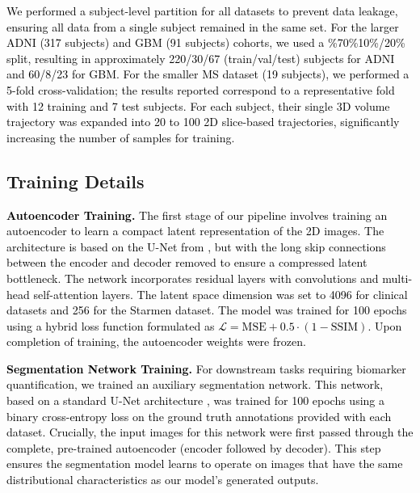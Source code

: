 \documentclass[twoside]{article}
\newcommand{\bc}[1]{\textcolor{black}{#1}}
\begin{document}
\bc{We performed a subject-level partition for all datasets to prevent data leakage, ensuring all data from a single subject remained in the same set. For the larger ADNI (317 subjects) and GBM (91 subjects) cohorts, we used a \%70\%10\%/20\% split, resulting in approximately 220/30/67 (train/val/test) subjects for ADNI and 60/8/23 for GBM. For the smaller MS dataset (19 subjects), we performed a 5-fold cross-validation; the results reported correspond to a representative fold with 12 training and 7 test subjects. For each subject, their single 3D volume trajectory was expanded into 20 to 100 2D slice-based trajectories, significantly increasing the number of samples for training.}













\subsection{Training Details}
\label{app:training_details}


\bc{
\textbf{Autoencoder Training.} The first stage of our pipeline involves training an autoencoder to learn a compact latent representation of the 2D images. The architecture is based on the U-Net from \citep{dhariwal2021diffusion}, but with the long skip connections between the encoder and decoder removed to ensure a compressed latent bottleneck. The network incorporates residual layers with convolutions and multi-head self-attention layers. The latent space dimension was set to 4096 for clinical datasets and 256 for the Starmen dataset. The model was trained for 100 epochs using a hybrid loss function formulated as $\mathcal{L} = \text{MSE} + 0.5 \cdot (1 - \text{SSIM})$. Upon completion of training, the autoencoder weights were frozen.}

\bc{
\textbf{Segmentation Network Training.} For downstream tasks requiring biomarker quantification, we trained an auxiliary segmentation network. This network, based on a standard U-Net architecture \citep{isensee2021nnu}, was trained for 100 epochs using a binary cross-entropy loss on the ground truth annotations provided with each dataset. Crucially, the input images for this network were first passed through the complete, pre-trained autoencoder (encoder followed by decoder). This step ensures the segmentation model learns to operate on images that have the same distributional characteristics as our model's generated outputs.}
\end{document}
